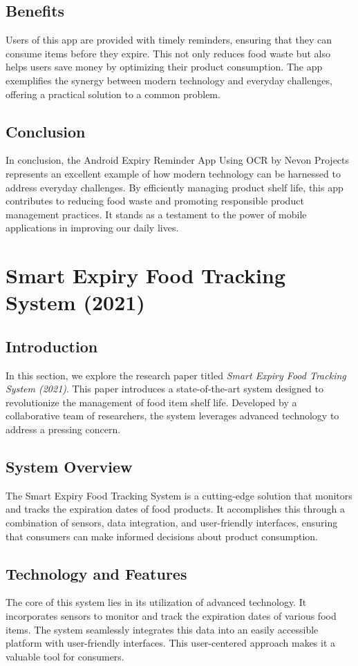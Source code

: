 \subsection{Benefits}
Users of this app are provided with timely reminders, ensuring that they can consume items before they expire. This not only reduces food waste but also helps users save money by optimizing their product consumption. The app exemplifies the synergy between modern technology and everyday challenges, offering a practical solution to a common problem.

\subsection{Conclusion}
In conclusion, the Android Expiry Reminder App Using OCR by Nevon Projects represents an excellent example of how modern technology can be harnessed to address everyday challenges. By efficiently managing product shelf life, this app contributes to reducing food waste and promoting responsible product management practices. It stands as a testament to the power of mobile applications in improving our daily lives.


\section{Smart Expiry Food Tracking System (2021)}

\subsection{Introduction}
In this section, we explore the research paper titled \textit{Smart Expiry Food Tracking System (2021)}. This paper introduces a state-of-the-art system designed to revolutionize the management of food item shelf life. Developed by a collaborative team of researchers, the system leverages advanced technology to address a pressing concern.

\subsection{System Overview}
The Smart Expiry Food Tracking System is a cutting-edge solution that monitors and tracks the expiration dates of food products. It accomplishes this through a combination of sensors, data integration, and user-friendly interfaces, ensuring that consumers can make informed decisions about product consumption.

\subsection{Technology and Features}
The core of this system lies in its utilization of advanced technology. It incorporates sensors to monitor and track the expiration dates of various food items. The system seamlessly integrates this data into an easily accessible platform with user-friendly interfaces. This user-centered approach makes it a valuable tool for consumers.

